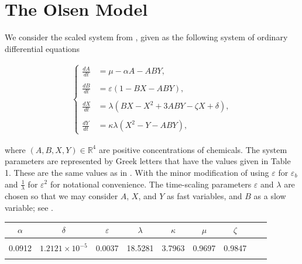 \documentclass{ws-ijbc}
\begin{document}
\section{The Olsen Model}

We consider the scaled system from \cite{Rescaling}, given as the following system of ordinary differential equations
    
\begin{equation}
\begin{aligned}
\begin{cases}
\frac{dA}{dt} &= \mu - \alpha A - ABY, \\ \\
\frac{dB}{dt} &= \varepsilon(1-BX - ABY), \\ \\
\frac{dX}{dt} &= \lambda(BX - X^2 +3ABY - \zeta X + \delta), \\ \\
\frac{dY}{dt} &= \kappa\lambda(X^2 - Y - ABY),
\end{cases}
\end{aligned}
\label{equation_1}
\end{equation}
    
\noindent
where $(A, B, X, Y)\in\mathbb{R}^{4}$ are positive concentrations of chemicals.  The system parameters are represented by Greek letters that have the values given in Table 1.  These are the same values as in \cite{Rescaling}.  With the minor modification of using $\varepsilon$ for $\varepsilon_{b}$ and $\frac{1}{\lambda}$ for $\varepsilon^{2}$ for notational convenience.  The time-scaling parameters $\varepsilon$ and $\lambda$ are chosen so that we may consider $A$, $X$, and $Y$ as fast variables, and $B$ as a slow variable; see \cite{Rescaling}.

\begin{table}[t!]
{\begin{tabular}{c  c  c  c  c  c  c  c  c} \\[-2pt]
\toprule
$\alpha$ & $\delta$ & $\varepsilon$ & $\lambda$ & $\kappa$ & $\mu$ & $\zeta$ \\[6pt]
\hline\\[-6pt]
0.0912 & $1.2121 \times 10^{-5}$ & 0.0037 & 18.5281 & 3.7963 & 0.9697 & 0.9847\\[1pt]
\botrule
\end{tabular}}
\end{table}
    
\end{document}
